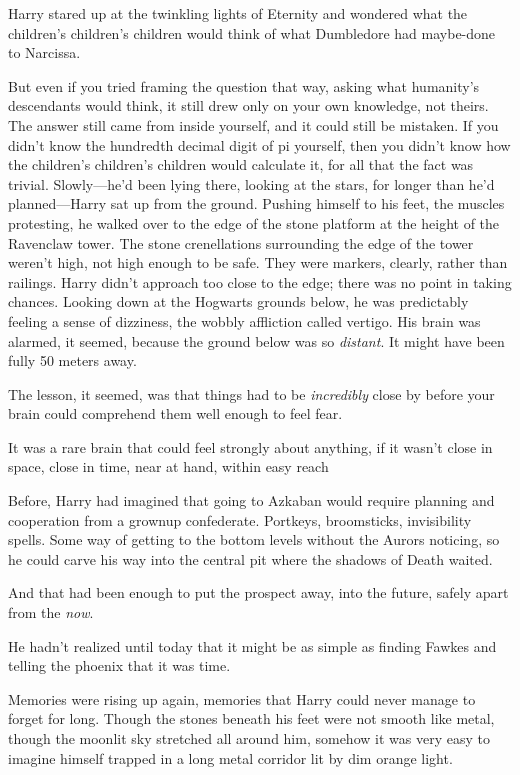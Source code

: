 Harry stared up at the twinkling lights of Eternity and wondered what the
children's children's children would think of what Dumbledore had maybe-done to
Narcissa.

But even if you tried framing the question that way, asking what humanity's
descendants would think, it still drew only on your own knowledge, not theirs.
The answer still came from inside yourself, and it could still be mistaken. If
you didn't know the hundredth decimal digit of pi yourself, then you didn't
know how the children's children's children would calculate it, for all that
the fact was trivial.
\sbreak
Slowly—he'd been lying there, looking at the stars, for longer than he'd
planned—Harry sat up from the ground. Pushing himself to his feet, the
muscles protesting, he walked over to the edge of the stone platform at the
height of the Ravenclaw tower. The stone crenellations surrounding the edge of
the tower weren't high, not high enough to be safe. They were markers, clearly,
rather than railings. Harry didn't approach too close to the edge; there was no
point in taking chances. Looking down at the Hogwarts grounds below, he was
predictably feeling a sense of dizziness, the wobbly affliction called vertigo.
His brain was alarmed, it seemed, because the ground below was so
\emph{distant}. It might have been fully 50 meters away.

The lesson, it seemed, was that things had to be \emph{incredibly} close by
before your brain could comprehend them well enough to feel fear.

It was a rare brain that could feel strongly about anything, if it wasn't close
in space, close in time, near at hand, within easy reach{\el}

Before, Harry had imagined that going to Azkaban would require planning and
cooperation from a grownup confederate. Portkeys, broomsticks, invisibility
spells. Some way of getting to the bottom levels without the Aurors noticing,
so he could carve his way into the central pit where the shadows of Death
waited.

And that had been enough to put the prospect away, into the future, safely
apart from the \emph{now}.

He hadn't realized until today that it might be as simple as finding Fawkes and
telling the phoenix that it was time.

Memories were rising up again, memories that Harry could never manage to forget
for long. Though the stones beneath his feet were not smooth like metal, though
the moonlit sky stretched all around him, somehow it was very easy to imagine
himself trapped in a long metal corridor lit by dim orange light.

